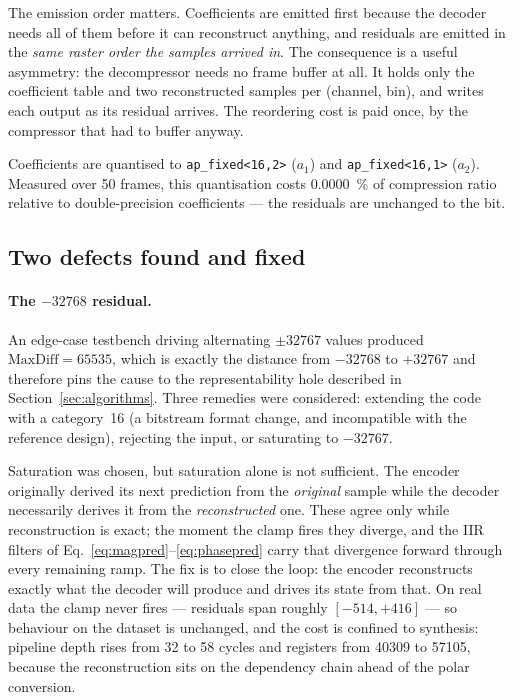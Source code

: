 \documentclass[10pt,twocolumn]{article}
\begin{document}
The emission order matters. Coefficients are emitted first because the decoder
needs all of them before it can reconstruct anything, and residuals are emitted
in the \emph{same raster order the samples arrived in}. The consequence is a
useful asymmetry: the decompressor needs no frame buffer at all. It holds only
the coefficient table and two reconstructed samples per (channel, bin), and
writes each output as its residual arrives. The reordering cost is paid once,
by the compressor that had to buffer anyway.

Coefficients are quantised to \texttt{ap\_fixed<16,2>} ($a_1$) and
\texttt{ap\_fixed<16,1>} ($a_2$). Measured over 50 frames, this quantisation
costs \SI{0.0000}{\percent} of compression ratio relative to double-precision
coefficients --- the residuals are unchanged to the bit.

\subsection{Two defects found and fixed}
\label{sec:defects}

\paragraph{The $-32768$ residual.}
An edge-case testbench driving alternating $\pm32767$ values produced
$\mathrm{MaxDiff} = 65535$, which is exactly the distance from $-32768$ to
$+32767$ and therefore pins the cause to the representability hole described in
Section~\ref{sec:algorithms}. Three remedies were considered: extending the
code with a category~16 (a bitstream format change, and incompatible with the
reference design), rejecting the input, or saturating to $-32767$.

Saturation was chosen, but saturation alone is not sufficient. The encoder
originally derived its next prediction from the \emph{original} sample while
the decoder necessarily derives it from the \emph{reconstructed} one. These
agree only while reconstruction is exact; the moment the clamp fires they
diverge, and the IIR filters of Eq.~\eqref{eq:magpred}--\eqref{eq:phasepred}
carry that divergence forward through every remaining ramp. The fix is to close
the loop: the encoder reconstructs exactly what the decoder will produce and
drives its state from that. On real data the clamp never fires --- residuals
span roughly $[-514, +416]$ --- so behaviour on the dataset is unchanged, and
the cost is confined to synthesis: pipeline depth rises from 32 to 58 cycles
and registers from \num{40309} to \num{57105}, because the reconstruction sits
on the dependency chain ahead of the polar conversion.
\end{document}
